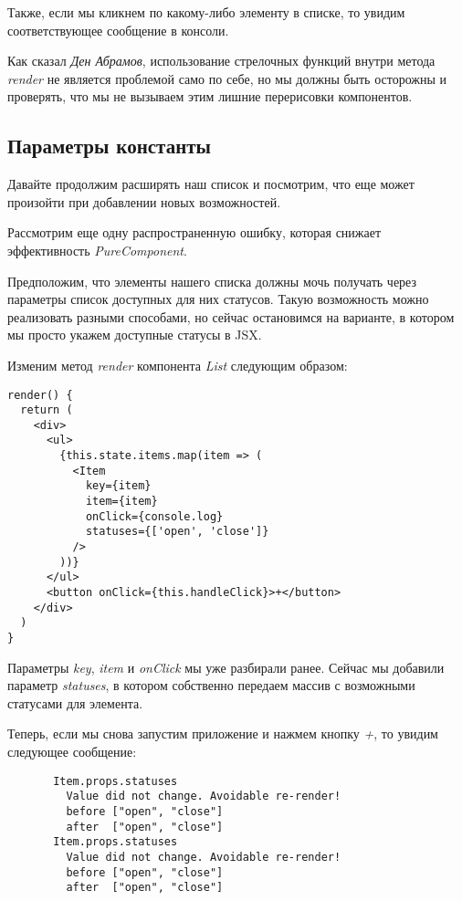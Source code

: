 Также, если мы кликнем по какому-либо элементу в списке, то увидим соответствующее сообщение в консоли.

Как сказал \textit{Ден Абрамов}, использование стрелочных функций внутри метода \textit{render} не является проблемой само по себе, но мы должны быть осторожны и проверять, что мы не вызываем этим лишние перерисовки компонентов.
 

\subsection{Параметры константы}

Давайте продолжим расширять наш список и посмотрим, что еще может произойти при добавлении новых возможностей. 

Рассмотрим еще одну распространенную ошибку, которая снижает эффективность \textit{PureComponent}.

Предположим, что элементы нашего списка должны мочь получать через параметры список доступных для них статусов. Такую возможность можно реализовать разными способами, но сейчас остановимся на варианте, в котором мы просто укажем доступные статусы в JSX.

Изменим метод \textit{render} компонента \textit{List} следующим образом:

\begin{lstlisting}
render() {
  return (
    <div>
      <ul>
        {this.state.items.map(item => (
          <Item
            key={item}
            item={item}
            onClick={console.log}
            statuses={['open', 'close']}
          />
        ))}
      </ul>
      <button onClick={this.handleClick}>+</button>
    </div>
  )
}
\end{lstlisting}

Параметры \textit{key}, \textit{item} и \textit{onClick} мы уже разбирали ранее. Сейчас мы добавили параметр \textit{statuses}, в котором собственно передаем массив с возможными статусами для элемента.

Теперь, если мы снова запустим приложение и нажмем кнопку \textit{+}, то увидим следующее сообщение:

\begin{lstlisting}
       Item.props.statuses
         Value did not change. Avoidable re-render!
         before ["open", "close"]
         after  ["open", "close"]
       Item.props.statuses
         Value did not change. Avoidable re-render!
         before ["open", "close"]
         after  ["open", "close"]
\end{lstlisting}

